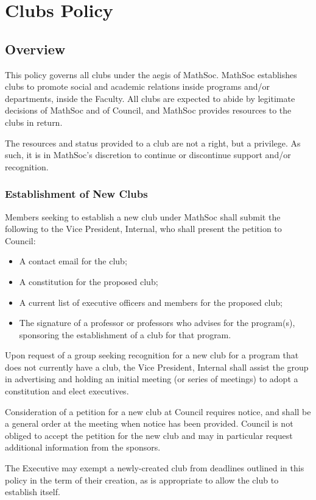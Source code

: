 \section{Clubs Policy}
\subsection{Overview}
This policy governs all clubs under the aegis of MathSoc. MathSoc establishes
clubs to promote social and academic relations inside programs and/or
departments, inside the Faculty. All clubs are expected to abide by legitimate
decisions of MathSoc and of Council, and MathSoc provides resources to the clubs
in return.

The resources and status provided to a club are not a right, but a privilege.
As such, it is in MathSoc's discretion to continue or discontinue support and/or
recognition.

\subsubsection{Establishment of New Clubs}
Members seeking to establish a new club under MathSoc shall submit the following
to the Vice President, Internal, who shall present the petition to Council:

\begin{itemize}
  \item A contact email for the club;
  \item A constitution for the proposed club;
  \item A current list of executive officers and members for the proposed club;
  \item The signature of a professor or professors who advises for the
	  program(s), sponsoring the establishment of a club for that program.
\end{itemize}

Upon request of a group seeking recognition for a new club for a program that
does not currently have a club, the Vice President, Internal shall assist the
group in advertising and holding an initial meeting (or series of meetings) to
adopt a constitution and elect executives.

Consideration of a petition for a new club at Council requires notice, and shall
be a general order at the meeting when notice has been provided. Council is not
obliged to accept the petition for the new club and may in particular request
additional information from the sponsors.

The Executive may exempt a newly-created club from deadlines outlined in this
policy in the term of their creation, as is appropriate to allow the club to
establish itself.

